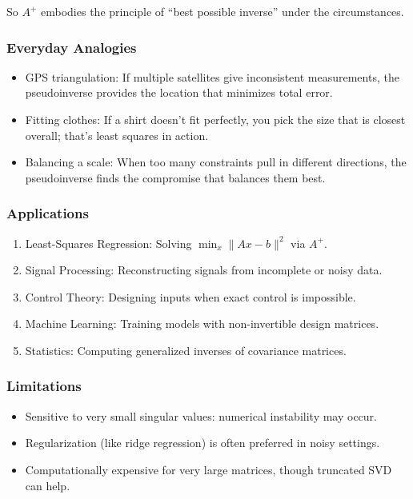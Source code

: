 \documentclass[
  letterpaper,
  DIV=11,
  numbers=noendperiod]{scrreprt}
\providecommand{\tightlist}{%
  \setlength{\itemsep}{0pt}\setlength{\parskip}{0pt}}
\begin{document}
So \(A^+\) embodies the principle of ``best possible inverse'' under the
circumstances.

\subsubsection{Everyday Analogies}\label{everyday-analogies-81}

\begin{itemize}
\tightlist
\item
  GPS triangulation: If multiple satellites give inconsistent
  measurements, the pseudoinverse provides the location that minimizes
  total error.
\item
  Fitting clothes: If a shirt doesn't fit perfectly, you pick the size
  that is closest overall; that's least squares in action.
\item
  Balancing a scale: When too many constraints pull in different
  directions, the pseudoinverse finds the compromise that balances them
  best.
\end{itemize}

\subsubsection{Applications}\label{applications-45}

\begin{enumerate}
\def\labelenumi{\arabic{enumi}.}
\tightlist
\item
  Least-Squares Regression: Solving \(\min_x \|Ax - b\|^2\) via \(A^+\).
\item
  Signal Processing: Reconstructing signals from incomplete or noisy
  data.
\item
  Control Theory: Designing inputs when exact control is impossible.
\item
  Machine Learning: Training models with non-invertible design matrices.
\item
  Statistics: Computing generalized inverses of covariance matrices.
\end{enumerate}

\subsubsection{Limitations}\label{limitations}

\begin{itemize}
\tightlist
\item
  Sensitive to very small singular values: numerical instability may
  occur.
\item
  Regularization (like ridge regression) is often preferred in noisy
  settings.
\item
  Computationally expensive for very large matrices, though truncated
  SVD can help.
\end{itemize}
\end{document}

